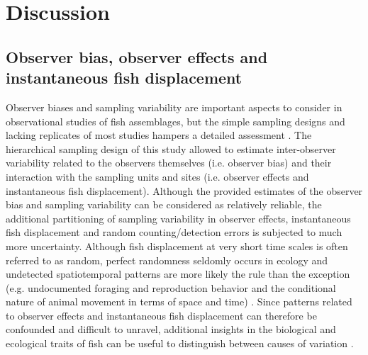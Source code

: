 \documentclass[10pt,letterpaper]{article}
\begin{document}
\section{Discussion}

\subsection{Observer bias, observer effects and instantaneous fish displacement}

Observer biases and sampling variability are important aspects to consider in observational studies of fish assemblages, but the simple sampling designs and lacking replicates of most studies hampers a detailed assessment \cite{Bernard2013,Murphy2010}. The hierarchical sampling design of this study allowed to estimate inter-observer variability related to the observers themselves (i.e. observer bias) and their interaction with the sampling units and sites (i.e. observer effects and instantaneous fish displacement). Although the provided estimates of the observer bias and sampling variability can be considered as relatively reliable, the additional partitioning of sampling variability in observer effects, instantaneous fish displacement and random counting/detection errors is subjected to much more uncertainty. Although fish displacement at very short time scales is often referred to as random, perfect randomness seldomly occurs in ecology and undetected spatiotemporal patterns are more likely the rule than the exception (e.g. undocumented foraging and reproduction behavior and the conditional nature of animal movement in terms of space and time) \cite{Dornelas2006CoralBiodiversity}. Since patterns related to observer effects and instantaneous fish displacement can therefore be confounded and difficult to unravel, additional insights in the biological and ecological traits of fish can be useful to distinguish between causes of variation \cite{Kulbicki2010,MacNeil2008,Pais2017}.  
\end{document}
